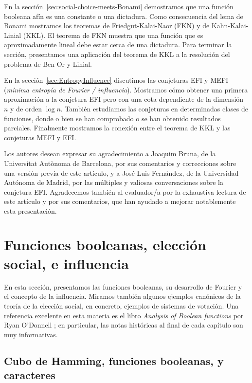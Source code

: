 \documentclass[autocontact]{gaceta}
\begin{document}
En la sección~\ref{sec:social-choice-meets-Bonami} demostramos que una función booleana afín es una constante o una dictadura. Como consecuencia del lema de Bonami mostramos los teoremas de Friedgut-Kalai-Naor (FKN) y de Kahn-Kalai-Linial (KKL). El teorema de FKN muestra que una función que es aproximadamente lineal debe estar cerca de una dictadura. Para terminar la sección, presentamos una aplicación del teorema de KKL a la resolución del problema de Ben-Or y Linial.

En la sección~\ref{sec:EntropyInfluence} discutimos las conjeturas EFI y MEFI (\emph{mínima entropía de Fourier / influencia}). Mostramos cómo obtener una primera aproximación a la conjetura EFI pero con una cota dependiente de la dimensión $n$ y de orden $\log n$. También estudiamos las conjeturas en determinadas clases de funciones, donde o bien se han comprobado o se han obtenido resultados parciales. Finalmente mostramos la conexión entre el teorema de KKL y las conjeturas MEFI y EFI.

Los autores desean expresar su agradecimiento a Joaquim Bruna, de la Universitat Autònoma de Barcelona, por sus comentarios y correcciones sobre una versión previa de este artículo, y a José Luis Fernández, de la Universidad Autónoma de Madrid, por las múltiples y valiosas conversaciones sobre la conjetura EFI. Agradecemos también al evaluador/a por la exhaustiva lectura de este artículo y por sus comentarios, que han ayudado a mejorar notablemente esta presentación.

\section{Funciones booleanas, elección social, e influencia}\label{sec:prelim}

En esta sección, presentamos las funciones booleanas, su desarrollo de Fourier y el concepto de la influencia. Miramos también algunos ejemplos canónicos de la teoría de la elección social, en concreto, ejemplos de sistemas de votación. Una referencia excelente en esta materia es el libro \emph{Analysis of Boolean functions} por Ryan O'Donnell \cite{O'Do21}; en particular, las notas históricas al final de cada capítulo son muy informativas.

\subsection{Cubo de Hamming, funciones booleanas, y caracteres}
\end{document}
